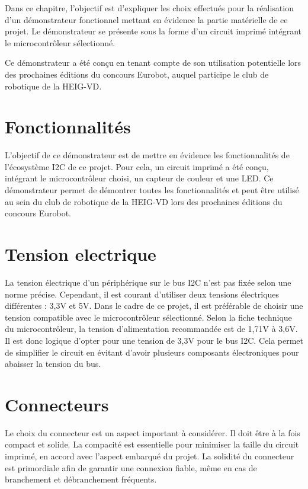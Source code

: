 Dans ce chapitre, l'objectif est d'expliquer les choix effectués pour la réalisation d'un démonstrateur fonctionnel mettant en évidence la partie matérielle de ce projet.
Le démonstrateur se présente sous la forme d'un circuit imprimé intégrant le microcontrôleur sélectionné.

Ce démonstrateur a été conçu en tenant compte de son utilisation potentielle lors des prochaines éditions du concours Eurobot, auquel participe le club de robotique de la HEIG-VD.

\section{Fonctionnalités}

L'objectif de ce démonstrateur est de mettre en évidence les fonctionnalités de l'écosystème I2C de ce projet.
Pour cela, un circuit imprimé a été conçu, intégrant le microcontrôleur choisi, un capteur de couleur et une LED.
Ce démonstrateur permet de démontrer toutes les fonctionnalités et peut être utilisé au sein du club de robotique de la HEIG-VD lors des prochaines éditions du concours Eurobot.

\section{Tension electrique}

La tension électrique d'un périphérique sur le bus I2C n'est pas fixée selon une norme précise.
Cependant, il est courant d'utiliser deux tensions électriques différentes : 3,3V et 5V.
Dans le cadre de ce projet, il est préférable de choisir une tension compatible avec le microcontrôleur sélectionné.
Selon la fiche technique du microcontrôleur, la tension d'alimentation recommandée est de 1,71V à 3,6V.
Il est donc logique d'opter pour une tension de 3,3V pour le bus I2C.
Cela permet de simplifier le circuit en évitant d'avoir plusieurs composants électroniques pour abaisser la tension du bus.


\section{Connecteurs}

Le choix du connecteur est un aspect important à considérer.
Il doit être à la fois compact et solide.
La compacité est essentielle pour minimiser la taille du circuit imprimé, en accord avec l'aspect embarqué du projet.
La solidité du connecteur est primordiale afin de garantir une connexion fiable, même en cas de branchement et débranchement fréquents.

